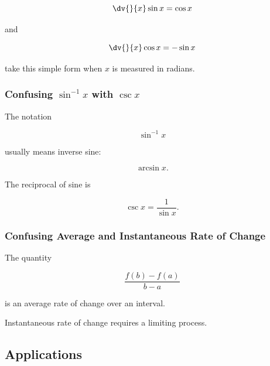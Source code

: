 \[ \dv{}{x}\sin x=\cos x \]

and

\[ \dv{}{x}\cos x=-\sin x \]

take this simple form when \(x\) is measured in radians.

\subsubsection{Confusing \(\sin^{-1}x\) with \(\csc x\)}

The notation

\[ \sin^{-1}x \]

usually means inverse sine:

\[ \arcsin x. \]

The reciprocal of sine is

\[ \csc x=\frac1{\sin x}. \]

\subsubsection{Confusing Average and Instantaneous Rate of Change}

The quantity

\[ \frac{f(b)-f(a)}{b-a} \]

is an average rate of change over an interval.

Instantaneous rate of change requires a limiting process.

\subsection{Applications}
\label{subsec:precalculus-applications}

